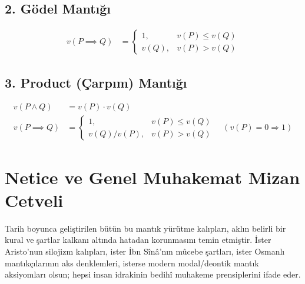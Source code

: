 \documentclass[11pt, a4paper]{article}
\begin{document}
\subsection{2. Gödel Mantığı}
\begin{align}
v(P \implies Q) &= 
\begin{cases}
1, & v(P) \le v(Q) \\
v(Q), & v(P) > v(Q)
\end{cases}
\end{align}

\subsection{3. Product (Çarpım) Mantığı}
\begin{align}
v(P \land Q) &= v(P) \cdot v(Q) \\
v(P \implies Q) &= \begin{cases} 1, & v(P) \le v(Q) \\ v(Q)/v(P), & v(P) > v(Q) \end{cases} \quad (v(P) = 0 \Rightarrow 1)
\end{align}

\section{Netice ve Genel Muhakemat Mizan Cetveli}

Tarih boyunca geliştirilen bütün bu mantık yürütme kalıpları, aklın belirli bir kural ve şartlar kalkanı altında hatadan korunmasını temin etmiştir. İster Aristo'nun silojizm kalıpları, ister İbn Sînâ'nın mûcebe şartları, ister Osmanlı mantıkçılarının aks denklemleri, isterse modern modal/deontik mantık aksiyomları olsun; hepsi insan idrakinin bedihî muhakeme prensiplerini ifade eder.
\end{document}
